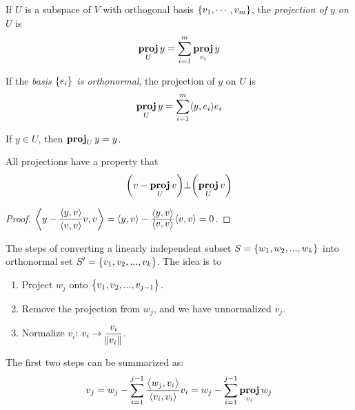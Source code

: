 \begin{definition}
    If $U$ is a subspace of $V$ with orthogonal basis $\set{v_1, \cdots, v_m}$, the \emph{projection of $y$ on $U$} is
    \begin{equation}
        \projection{y}{U} = \sum_{i=1}^{m} \projection{y}{v_i}
    \end{equation}
    
    If the \emph{basis $\set{e_i}$ is orthonormal}, the projection of $y$ on $U$ is
    \begin{equation}
        \projection{y}{U} = \sum_{i=1}^{m} \innerproduct{y}{e_i} e_i
    \end{equation}
    
    If $y \in U$, then $\projection{y}{U} = y$.
\end{definition}

\begin{theorem}
    All projections have a property that
    \begin{equation}
        \mleft(v - \projection{v}{U}\mright) \bot \mleft(\projection{v}{U}\mright)
    \end{equation}
\end{theorem}
\begin{proof}
    $\innerproduct{y - \frac{\innerproduct{y}{v}}{\innerproduct{v}{v}} v}{v} = \innerproduct{y}{v} - \frac{\innerproduct{y}{v}}{\innerproduct{v}{v}} \innerproduct{v}{v} = 0$.
\end{proof}


\begin{theorem}\label{gram_schmidt_process}
    The steps of converting a linearly independent subset $S=\set{w_1, w_2, ..., w_k}$ into orthonormal set $S^\prime=\set{v_1, v_2, ..., v_k}$. The idea is to 
    \begin{enumerate}
        \item Project $w_{j}$ onto $\set{v_1, v_2, ..., v_{j-1}}$.
        \item Remove the projection from $w_j$, and we have unnormalized $v_j$.
        \item Normalize $v_i$: $v_i \rightarrow \displaystyle \frac{v_i}{\norm{v_i}}$.
    \end{enumerate}
    
    The first two steps can be summarized as:
    \begin{equation}
        v_j = w_j - \sum_{i=1}^{j-1} \frac{\innerproduct{w_j}{v_i}}{\innerproduct{v_i}{v_i}} v_i = w_j - \sum_{i=1}^{j-1} \projection{w_j}{v_i}
    \end{equation}
\end{theorem}

